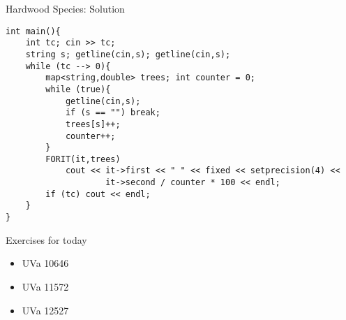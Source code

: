 \documentclass[12pt,t]{beamer}
\newcommand{\bi}{\begin{itemize}}
\newcommand{\ei}{\end{itemize}}
\begin{document}
\begin{frame}[fragile]{Hardwood Species: Solution}
    \begin{verbatim}
int main(){
    int tc; cin >> tc;
    string s; getline(cin,s); getline(cin,s);
    while (tc --> 0){
        map<string,double> trees; int counter = 0;
        while (true){
            getline(cin,s);
            if (s == "") break;
            trees[s]++;
            counter++;
        }
        FORIT(it,trees)
            cout << it->first << " " << fixed << setprecision(4) << 
                    it->second / counter * 100 << endl;
        if (tc) cout << endl;
    }
}\end{verbatim}
\end{frame}



\begin{frame}[fragile]{Exercises for today}
    \bi
      \item UVa 10646
      \item UVa 11572
      \item UVa 12527
    \ei
\end{frame}
\end{document}
